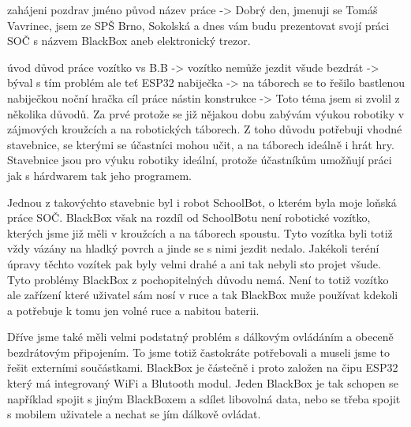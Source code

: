 zahájeni
{
    pozdrav
    jméno
    původ
    název práce
}-> Dobrý den, jmenuji se Tomáš Vavrinec, jsem ze SPŠ Brno, Sokolská
    a dnes vám budu prezentovat 
    svojí práci SOČ s názvem BlackBox aneb elektronický trezor. %

úvod
{
    důvod práce
        vozítko vs B.B  -> vozítko nemůže jezdit všude
        bezdrát         -> býval s tím problém ale teť ESP32
        nabiječka       -> na táborech se to řešilo bastlenou nabiječkou
        noční hračka
    cíl práce
    nástin konstrukce
}-> Toto téma jsem si zvolil z několika důvodů. Za prvé protože se již nějakou dobu zabývám 
    výukou robotiky v zájmových kroužcích a na robotických táborech. Z toho důvodu potřebuji 
    vhodné stavebnice, se kterými se účastníci mohou učit, a na táborech ideálně i hrát hry.
    Stavebnice jsou pro výuku robotiky ideální, protože účastníkům umožňují práci jak 
    s hárdwarem tak jeho programem.

    Jednou z takovýchto stavebnic byl i robot SchoolBot, o kterém byla moje loňská práce SOČ.
    BlackBox však na rozdíl od SchoolBotu není robotické vozítko, kterých jsme již měli v kroužcích
    a na táborech spoustu. 
    Tyto vozítka byli totiž vždy vázány na hladký povrch a jinde se s nimi jezdit nedalo.
    Jakékoli teréní úpravy těchto vozítek pak byly velmi drahé a ani tak nebyli sto projet všude.
    Tyto problémy BlackBox z pochopitelných důvodu nemá. Není to totiž vozítko ale zařízení které uživatel
    sám nosí v ruce a tak BlackBox muže používat kdekoli a potřebuje k tomu jen volné ruce a nabitou baterii.
    
    Dříve jsme také měli velmi podstatný problém s dálkovým ovládáním a obeceně bezdrátovým připojením.
    To jsme totiž častokráte potřebovali a museli jsme to řešit externími součástkami.
    BlackBox je částečně i proto založen na čipu ESP32 který má integrovaný WiFi a Blutooth modul.
    Jeden BlackBox je tak schopen se například spojit s jiným BlackBoxem a sdílet libovolná data, 
    nebo se třeba spojit s mobilem uživatele a nechat se jím dálkově ovládat.

